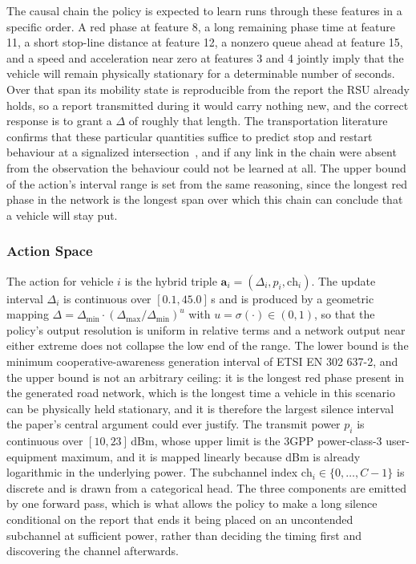 \documentclass[journal]{IEEEtran}
\begin{document}
The causal chain the policy is expected to learn runs through these features in a specific order. A red phase at feature 8, a long remaining phase time at feature 11, a short stop-line distance at feature 12, a nonzero queue ahead at feature 15, and a speed and acceleration near zero at features 3 and 4 jointly imply that the vehicle will remain physically stationary for a determinable number of seconds. Over that span its mobility state is reproducible from the report the RSU already holds, so a report transmitted during it would carry nothing new, and the correct response is to grant a $\Delta$ of roughly that length. The transportation literature confirms that these particular quantities suffice to predict stop and restart behaviour at a signalized intersection~\cite{sun2022}, and if any link in the chain were absent from the observation the behaviour could not be learned at all. The upper bound of the action's interval range is set from the same reasoning, since the longest red phase in the network is the longest span over which this chain can conclude that a vehicle will stay put.

\subsubsection{Action Space}
The action for vehicle $i$ is the hybrid triple $\mathbf{a}_i = (\Delta_i, p_i, \mathrm{ch}_i)$. The update interval $\Delta_i$ is continuous over $[0.1, 45.0]$\,s and is produced by a geometric mapping $\Delta = \Delta_{\min} \cdot (\Delta_{\max}/\Delta_{\min})^{u}$ with $u = \sigma(\cdot) \in (0,1)$, so that the policy's output resolution is uniform in relative terms and a network output near either extreme does not collapse the low end of the range. The lower bound is the minimum cooperative-awareness generation interval of ETSI EN 302 637-2, and the upper bound is not an arbitrary ceiling: it is the longest red phase present in the generated road network, which is the longest time a vehicle in this scenario can be physically held stationary, and it is therefore the largest silence interval the paper's central argument could ever justify. The transmit power $p_i$ is continuous over $[10, 23]$\,dBm, whose upper limit is the 3GPP power-class-3 user-equipment maximum, and it is mapped linearly because dBm is already logarithmic in the underlying power. The subchannel index $\mathrm{ch}_i \in \{0, \ldots, C-1\}$ is discrete and is drawn from a categorical head. The three components are emitted by one forward pass, which is what allows the policy to make a long silence conditional on the report that ends it being placed on an uncontended subchannel at sufficient power, rather than deciding the timing first and discovering the channel afterwards.
\end{document}
